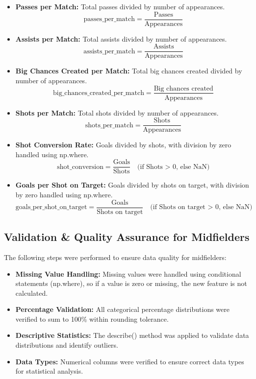 \documentclass[12pt,a4paper]{article}
\begin{document}
\begin{itemize}
    \item \textbf{Passes per Match:} Total passes divided by number of appearances.
    \[
    \text{passes\_per\_match} = \frac{\text{Passes}}{\text{Appearances}}
    \]
    
    \item \textbf{Assists per Match:} Total assists divided by number of appearances.
    \[
    \text{assists\_per\_match} = \frac{\text{Assists}}{\text{Appearances}}
    \]
    
    \item \textbf{Big Chances Created per Match:} Total big chances created divided by number of appearances.
    \[
    \text{big\_chances\_created\_per\_match} = \frac{\text{Big chances created}}{\text{Appearances}}
    \]
    
    \item \textbf{Shots per Match:} Total shots divided by number of appearances.
    \[
    \text{shots\_per\_match} = \frac{\text{Shots}}{\text{Appearances}}
    \]
    
    \item \textbf{Shot Conversion Rate:} Goals divided by shots, with division by zero handled using np.where.
    \[
    \text{shot\_conversion} = \frac{\text{Goals}}{\text{Shots}} \quad \text{(if Shots > 0, else NaN)}
    \]
    
    \item \textbf{Goals per Shot on Target:} Goals divided by shots on target, with division by zero handled using np.where.
    \[
    \text{goals\_per\_shot\_on\_target} = \frac{\text{Goals}}{\text{Shots on target}} \quad \text{(if Shots on target > 0, else NaN)}
    \]
\end{itemize}

\subsection{Validation \& Quality Assurance for Midfielders}

The following steps were performed to ensure data quality for midfielders:

\begin{itemize}
    \item \textbf{Missing Value Handling:} Missing values were handled using conditional statements (np.where), so if a value is zero or missing, the new feature is not calculated.
    \item \textbf{Percentage Validation:} All categorical percentage distributions were verified to sum to 100\% within rounding tolerance.
    \item \textbf{Descriptive Statistics:} The describe() method was applied to validate data distributions and identify outliers.
    \item \textbf{Data Types:} Numerical columns were verified to ensure correct data types for statistical analysis.
\end{itemize}
\newpage
\end{document}
